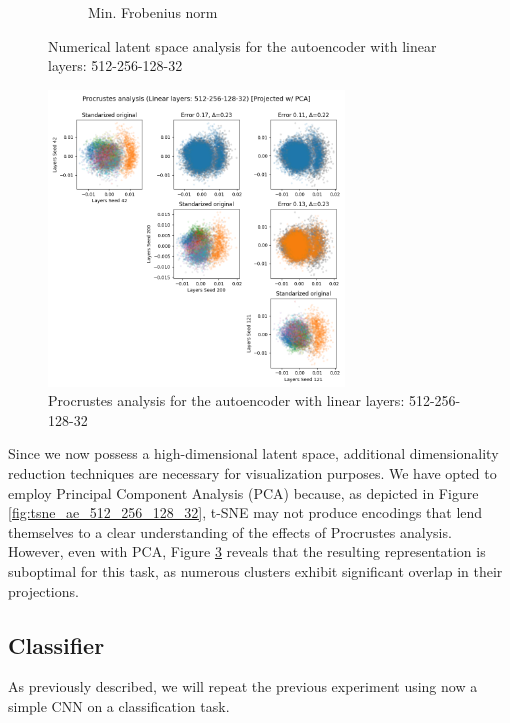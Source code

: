 \documentclass[../main.tex]{subfiles}
\begin{document}
\begin{figure}[ht!]
\begin{subfigure}[b]{0.45\textwidth}
        \caption{Min. Frobenius norm}
         \label{fig:frob_ae_512_256_128_32}
     \end{subfigure}
    \caption{Numerical latent space analysis for the autoencoder with linear layers: 512-256-128-32}
    \label{fig:lat_num_ae_512_256_128_32}
\end{figure}


\begin{figure}[ht!]
    \centering
    \includegraphics[width=0.7\textwidth]{figures/rs/sim_ae/procrustes_512-256-128-32__42_200_121.png} 
    \caption{Procrustes analysis for the autoencoder with linear layers: 512-256-128-32}
    \label{fig:proc_ae_512_256_128_32}
\end{figure}

Since we now possess a high-dimensional latent space, additional dimensionality reduction techniques are necessary for visualization purposes. We have opted to employ Principal Component Analysis (PCA) because, as depicted in Figure \ref{fig:tsne_ae_512_256_128_32}, t-SNE may not produce encodings that lend themselves to a clear understanding of the effects of Procrustes analysis. However, even with PCA, Figure \ref{fig:proc_ae_512_256_128_32} reveals that the resulting representation is suboptimal for this task, as numerous clusters exhibit significant overlap in their projections.


\subsection{Classifier}
As previously described, we will repeat the previous experiment using now a simple CNN on a classification task.\\
\end{document}
